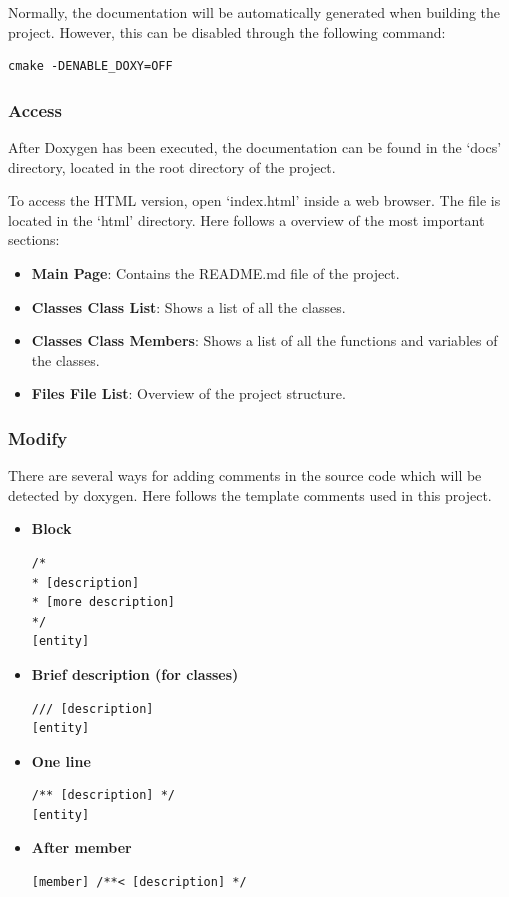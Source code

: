 \documentclass[]{article}
\begin{document}
Normally, the documentation will be automatically generated when building the project. However, this can be disabled through the following command:
\begin{lstlisting}
cmake -DENABLE_DOXY=OFF
\end{lstlisting}

\subsubsection{Access}
After Doxygen has been executed, the documentation can be found in the ‘docs’ directory, located in the root directory of the project.

To access the HTML version, open ‘index.html’ inside a web browser. The file is located in the ‘html’ directory. Here follows a overview of the most important sections:
\begin{itemize}
	\itemsep 0em
	\item \textbf{Main Page}: Contains the README.md file of the project.
	\item \textbf{Classes \textrangle{} Class List}: Shows a list of all the classes.
	\item \textbf{Classes \textrangle{} Class Members}: Shows a list of all the functions and variables of the classes.
	\item \textbf{Files \textrangle{} File List}: Overview of the project structure.
\end{itemize}

\subsubsection{Modify}
There are several ways for adding comments in the source code which will be detected by doxygen. Here follows the template comments used in this project.
\begin{itemize}
\item \textbf{Block}
\begin{lstlisting}
/*
* [description]
* [more description]
*/
[entity]
\end{lstlisting}

\item \textbf{Brief description (for classes)}
\begin{lstlisting}
/// [description]
[entity]
\end{lstlisting}

\item \textbf{One line}
\begin{lstlisting}
/** [description] */
[entity]
\end{lstlisting}

\item \textbf{After member}
\begin{lstlisting}
[member] /**< [description] */
\end{lstlisting}

\end{itemize}
\end{document}
